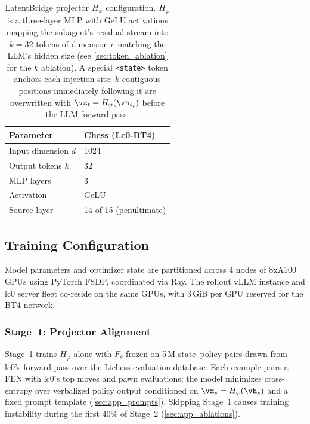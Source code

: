 \begin{table}[h]
\centering
\small
\begin{tabular}{ll}
\toprule
\textbf{Parameter}       & \textbf{Chess (Lc0-BT4)} \\
\midrule
Input dimension $d$      & 1024      \\
Output tokens $k$        & 32        \\
MLP layers               & 3         \\
Activation               & GeLU      \\
Source layer             & 14 of 15 (penultimate)  \\
\bottomrule
\end{tabular}
\vspace{2mm}\caption{LatentBridge projector $H_\varphi$ configuration. $H_\varphi$ is a three-layer MLP with GeLU activations mapping the subagent's
residual stream into $k{=}32$ tokens of dimension $e$ matching the LLM's hidden size
(see \cref{sec:token_ablation} for the $k$ ablation).
A special \texttt{<state>} token anchors each injection site; $k$ contiguous positions
immediately following it are overwritten with $\vz_t = H_\varphi(\vh_{s_t})$ before the
LLM forward pass.}
\label{tab:projector}
\end{table}



\subsection{Training Configuration}
\label{sec:app_training}
\label{sec:hyperparams}
Model parameters and optimizer state are partitioned across 4 nodes of 8xA100 GPUs using PyTorch FSDP,
coordinated via Ray.
The rollout vLLM instance and lc0 server fleet co-reside on the same GPUs,
with 3\,GiB per GPU reserved for the BT4 network.

\subsubsection{Stage~1: Projector Alignment}
\label{sec:app_stage1}

Stage~1 trains $H_\varphi$ alone with $F_\theta$ frozen on 5\,M state--policy pairs
drawn from lc0's forward pass over the Lichess evaluation database.
Each example pairs a FEN with lc0's top moves and pawn evaluations; the model minimizes
cross-entropy over verbalized policy output conditioned on
$\vz_s = H_\varphi(\vh_s)$ and a fixed prompt template (\cref{sec:app_prompts}).
Skipping Stage~1 causes training instability during the first 40\% of Stage~2
(\cref{sec:app_ablations}).

